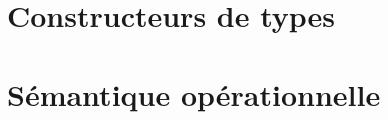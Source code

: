 \documentclass{article}
\begin{document}
\section{Constructeurs de types}

\section{Sémantique opérationnelle}
\end{document}
